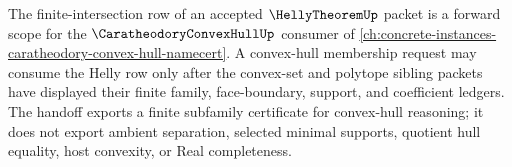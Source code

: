 \begin{theorem}
\label{thm:helly-theorem-convex-hull-forward-scope}
The finite-intersection row of an accepted $\HellyTheoremUp$ packet is a forward scope for the $\CaratheodoryConvexHullUp$ consumer of \autoref{ch:concrete-instances-caratheodory-convex-hull-namecert}. A convex-hull membership request may consume the Helly row only after the convex-set and polytope sibling packets have displayed their finite family, face-boundary, support, and coefficient ledgers. The handoff exports a finite subfamily certificate for convex-hull reasoning; it does not export ambient separation, selected minimal supports, quotient hull equality, host convexity, or Real completeness.
\end{theorem}
